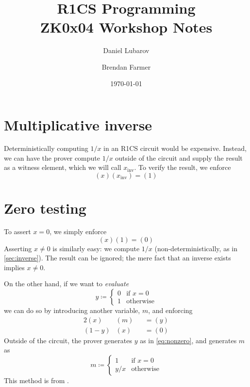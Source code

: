 \documentclass{article}
\title{R1CS Programming \\ \large ZK0x04 Workshop Notes}
\author{Daniel Lubarov \and Brendan Farmer}
\date{\today}
\begin{document}
\maketitle

{\hypersetup{hidelinks} \tableofcontents}
\newpage


\section{Multiplicative inverse} \label{sec:inverse}

Deterministically computing $1 / x$ in an R1CS circuit would be expensive. Instead, we can have the prover compute $1 / x$ outside of the circuit and supply the result as a witness element, which we will call $x_\mathrm{inv}$. To verify the result, we enforce
\begin{equation}
  (x) (x_\mathrm{inv}) = (1)
\end{equation}


\section{Zero testing}

To assert $x = 0$, we simply enforce
\begin{equation}
  (x) (1) = (0)
\end{equation}
Asserting $x \ne 0$ is similarly easy: we compute $1 / x$ (non-deterministically, as in \autoref{sec:inverse}). The result can be ignored; the mere fact that an inverse exists implies $x \ne 0$.

On the other hand, if we want to \textit{evaluate}
\begin{equation} \label{eq:nonzero}
  y \coloneqq
  \begin{cases}
    0 & \text{if $x = 0$} \\
    1 & \text{otherwise}
  \end{cases}
\end{equation}
we can do so by introducing another variable, $m$, and enforcing
\begin{alignat}{2}
  (x)     & (m) &&= (y) \\
  (1 - y) & (x) &&= (0)
\end{alignat}
Outside of the circuit, the prover generates $y$ as in \autoref{eq:nonzero}, and generates $m$ as
\begin{equation}
  m \coloneqq
  \begin{cases}
    1 & \text{if $x = 0$} \\
    y / x & \text{otherwise}
  \end{cases}
\end{equation}
This method is from \cite{parno2013pinocchio}.
\end{document}

